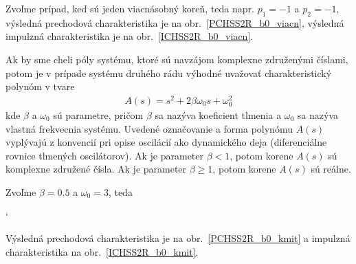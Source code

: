 \documentclass[a4paper, 10pt, ]{article}
\begin{document}
Zvoľme prípad, keď sú jeden viacnásobný koreň, teda napr. $p_1 = -1$ a $p_2 = -1$, výsledná prechodová charakteristika je na obr.~\ref{PCHSS2R_b0_viacn}, výsledná impulzná charakteristika je na obr.~\ref{ICHSS2R_b0_viacn}.

\begin{center}


	\label{PCHSS2R_b0_viacn}

\end{center}

\begin{center}


	\label{ICHSS2R_b0_viacn}

\end{center}


Ak by sme cheli póly systému, ktoré sú navzájom komplexne združenými číslami, potom je v prípade systému druhého rádu výhodné uvažovať charakteristický polynóm v tvare
\begin{align}
    A(s) = s^2 + 2 \beta \omega_0 s + \omega_0^2
\end{align}
kde $\beta$ a $\omega_0$ sú parametre, pričom $\beta$ sa nazýva koeficient tlmenia a $\omega_0$ sa nazýva vlastná frekvecnia systému. Uvedené označovanie a forma polynómu $A(s)$ vyplývajú z konvencií pri opise oscilácií ako dynamického deja (diferenciálne rovnice tlmených oscilátorov). Ak je parameter $\beta < 1$, potom korene $A(s)$ sú komplexne združené čísla. Ak je parameter $\beta \geq 1$, potom korene $A(s)$ sú reálne.

Zvoľme $\beta = 0.5$ a $\omega_0 = 3$, teda
{\catcode`

}
\noindent
Výsledná prechodová charakteristika je na obr.~\ref{PCHSS2R_b0_kmit} a impulzná charakteristika na obr.~\ref{ICHSS2R_b0_kmit}.


\begin{center}


	\label{PCHSS2R_b0_kmit}

\end{center}
\end{document}
